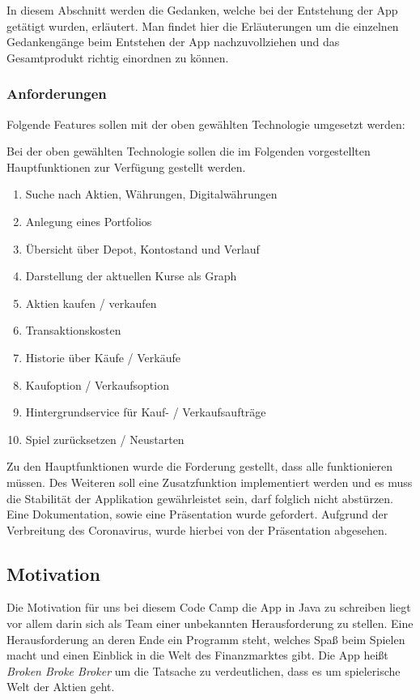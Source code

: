 \documentclass[10pt]{scrartcl}
\begin{document}
In diesem Abschnitt werden die Gedanken, welche bei der Entstehung der App getätigt wurden, erläutert. Man findet hier die Erläuterungen um die einzelnen Gedankengänge beim Entstehen der App nachzuvollziehen und das Gesamtprodukt richtig einordnen zu können.

\subsubsection{Anforderungen}
Folgende Features sollen mit der oben gewählten Technologie umgesetzt werden:

Bei der oben gewählten Technologie sollen die im Folgenden vorgestellten Hauptfunktionen zur Verfügung gestellt werden.

\begin{enumerate}
	\item 
	Suche nach Aktien, Währungen, Digitalwährungen
	\item
	Anlegung eines Portfolios
	\item
	Übersicht über Depot, Kontostand und Verlauf
	\item
	Darstellung der aktuellen Kurse als Graph
	\item
	Aktien kaufen / verkaufen
	\item
	Transaktionskosten
	\item
	Historie über Käufe / Verkäufe
	\item
	Kaufoption / Verkaufsoption
	\item
	Hintergrundservice für Kauf- / Verkaufsaufträge
	\item
	Spiel zurücksetzen / Neustarten
\end{enumerate}

Zu den Hauptfunktionen wurde die Forderung gestellt, dass alle funktionieren müssen. Des Weiteren soll eine Zusatzfunktion implementiert werden und es muss die Stabilität der Applikation gewährleistet sein, darf folglich nicht abstürzen. Eine Dokumentation, sowie eine Präsentation wurde gefordert. Aufgrund der Verbreitung des Coronavirus, wurde hierbei von der Präsentation abgesehen.

\subsection{Motivation}
Die Motivation für uns bei diesem Code Camp die App in Java zu schreiben liegt vor allem darin sich als Team einer unbekannten Herausforderung zu stellen. Eine Herausforderung an deren Ende ein Programm steht, welches Spaß beim Spielen macht und einen Einblick in die Welt des Finanzmarktes gibt. Die App heißt \textit{Broken Broke Broker} um die Tatsache zu verdeutlichen, dass es um spielerische Welt der Aktien geht.
\end{document}
